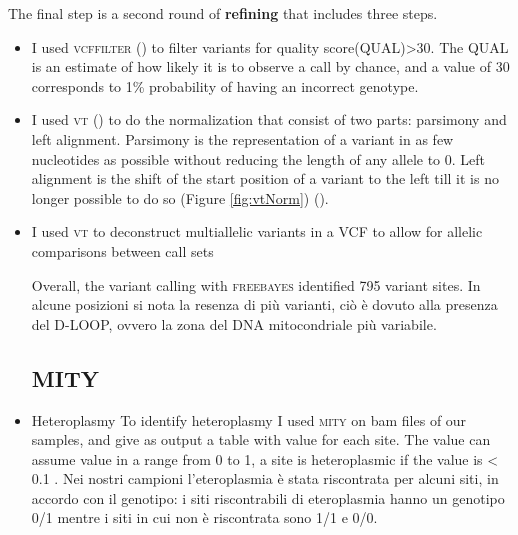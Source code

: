 The final step is a second round of \textbf{refining} that includes three steps. 
\begin{itemize}
    \item I used \textsc{vcffilter} (\cite{vcflib}) to filter variants for \gls{quality score}(QUAL)>30. The QUAL is an estimate of how likely it is to observe a call by chance, and a value of 30 corresponds to 1\% probability of having an incorrect genotype.
    \item I used \textsc{vt} (\cite{tan2015unified}) to do the normalization that consist of two parts: parsimony and left alignment. Parsimony is the representation of a variant in as few nucleotides as possible without reducing the length of any allele to 0. Left alignment is the shift of the start position of a variant to the left till it is no longer possible to do so (Figure \ref{fig:vtNorm}) (\cite{tan2015unified}).
    \item I used \textsc{vt} to deconstruct multiallelic variants in a VCF to allow for allelic comparisons between call sets
    \newline
    
Overall, the variant calling with \textsc{freebayes} identified 795 variant sites. In alcune posizioni si nota la resenza di più varianti, ciò è dovuto alla presenza del D-LOOP, ovvero la zona del DNA mitocondriale più variabile. 

\subsection{MITY}
\item Heteroplasmy \newline
To identify heteroplasmy I used \textsc{mity} on bam files of our samples, and give as output a table with value for each site.
The value can assume value in a range from 0 to 1, a site is heteroplasmic if the value is < 0.1 \cite{}.
Nei nostri campioni l'eteroplasmia è stata riscontrata per alcuni siti, in accordo con il genotipo: 
i siti riscontrabili di eteroplasmia hanno un genotipo 0/1  mentre i siti in cui non è riscontrata sono 1/1 e 0/0.\newline



\end{itemize}


